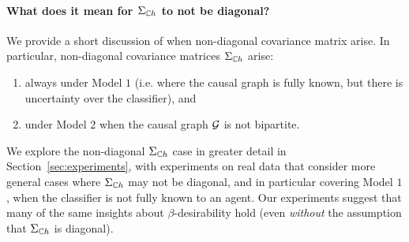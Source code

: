 \paragraph{What does it mean for $\Sigma_{\mathbb{C} h}$ to not be diagonal?} We provide a short discussion of when non-diagonal covariance matrix arise. In particular, non-diagonal covariance matrices $\Sigma_{\mathbb{C} h}$ arise:
\begin{enumerate}
    \item always under Model $1$ (i.e. where the causal graph is fully known, but there is uncertainty over the classifier), and 
    \item under Model $2$ when the causal graph $\mathcal{G}$ is not bipartite.
\end{enumerate}
We explore the non-diagonal $\Sigma_{\mathbb{C} h}$ case in greater detail in Section~\ref{sec:experiments}, with experiments on real data that consider more general cases where $\Sigma_{\mathbb{C} h}$ may not be diagonal, and in particular covering Model $1$, when the classifier is not fully known to an agent. Our experiments suggest that many of the same insights about $\beta$-desirability hold (even \emph{without} the assumption that $\Sigma_{\mathbb{C} h}$ is diagonal).








